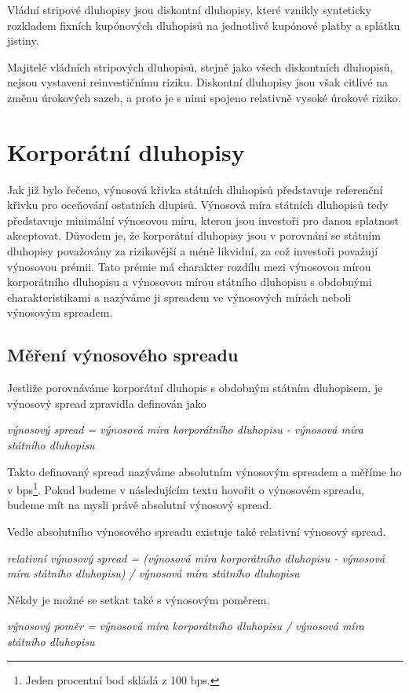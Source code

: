 \documentclass[a4paper]{book}
\begin{document}
Vládní stripové dluhopisy jsou diskontní dluhopisy, které vznikly synteticky rozkladem fixních kupónových dluhopisů na jednotlivé kupónové platby a splátku jistiny.

Majitelé vládních stripových dluhopisů, stejně jako všech diskontních dluhopisů, nejsou vystaveni reinvestičnímu riziku. Diskontní dluhopisy jsou však citlivé na změnu úrokových sazeb, a proto je s nimi spojeno relativně vysoké úrokové riziko.

\section{Korporátní dluhopisy}

Jak již bylo řečeno, výnosová křivka státních dluhopisů představuje referenční křivku pro oceňování ostatních dlupisů. Výnosová míra státních dluhopisů tedy představuje minimální výnosovou míru, kterou jsou investoři pro danou splatnost akceptovat. Důvodem je, že korporátní dluhopisy jsou v porovnání se státním dluhopisy považovány za rizikovější a méně likvidní, za což investoři považují výnosovou prémii. Tato prémie má charakter rozdílu mezi výnosovou mírou korporátního dluhopisu a výnosovou mírou státního dluhopisu s obdobnými charakteristikami a nazýváme ji spreadem ve výnosových mírách neboli výnosovým spreadem.

\subsection{Měření výnosového spreadu}

Jestliže porovnáváme korporátní dluhopis s obdobným státním dluhopisem, je výnosový spread zpravidla definován jako
\begin{center}
\textit{výnosový spread = výnosová míra korporátního dluhopisu - výnosová míra státního dluhopisu}
\end{center}
Takto definovaný spread nazýváme absolutním výnosovým spreadem a měříme ho v bps\footnote{Jeden procentní bod skládá z 100 bps.}. Pokud budeme v následujícím textu hovořit o výnosovém spreadu, budeme mít na mysli právě absolutní výnosový spread.

Vedle absolutního výnosového spreadu existuje také relativní výnosový spread.
\begin{center}
\textit{relativní výnosový spread = (výnosová míra korporátního dluhopisu - výnosová míra státního dluhopisu) / výnosová míra státního dluhopisu}
\end{center}
Někdy je možné se setkat také s výnosovým poměrem.
\begin{center}
\textit{výnosový poměr = výnosová míra korporátního dluhopisu / výnosová míra státního dluhopisu}
\end{center}
\end{document}
